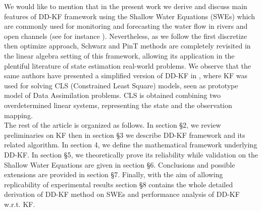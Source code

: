 \documentclass[smallcondensed]{svjour3}
\begin{document}
\noindent We would like to mention that in the present work we derive and discuss main features of DD-KF framework using the Shallow Water Equations (SWEs) which are commonly used for monitoring and forecasting the water flow
in rivers and open channels (see for instance \cite{Rafiee,Tirupachi}).  Nevertheless, as we follow the first discretize then optimize approach, Schwarz and PinT methods are completely revisited in the linear algebra setting of this framework, allowing its application in the plentiful  literature of  state estimation real-world problems. We observe that the same authors have presented a simplified version of DD-KF in \cite{PPAM2019}, where KF was used for solving  CLS (Constrained Least Square) models,
seen as  prototype model of Data Assimilation problems. CLS is obtained combining two overdetermined linear systems, representing the state and the
observation mapping. \\
\noindent The rest of the article is organized as follows. In section \S 2, we review preliminaries on KF then in section \S 3 we describe   DD-KF framework and its related algorithm. In section 4, we define the mathematical framework underlying DD-KF. In section \S 5, we theoretically prove its reliability  while  validation on the Shallow Water Equations are given in section \S 6.  Conclusions and possible extensions are provided in section \S 7. Finally, with the aim of allowing replicability of  experimental results section \S 8 contains  the whole detailed derivation of DD-KF method on  SWEs and performance analysis of DD-KF w.r.t. KF. 





\normalsize


\end{document}
